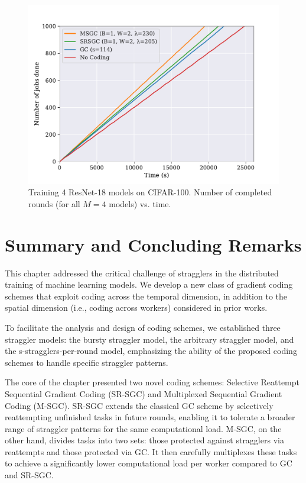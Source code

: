 \begin{figure}[!h]
    \centering
    \includegraphics[width=.8\textwidth]{figs/ch2/resnet_numrounds.pdf}
    \caption{ Training 4 ResNet-18 models on CIFAR-100. Number of completed rounds (for all $M=4$ models) vs. time.}
    \label{ch2:fig:resnet}
\end{figure}

\FloatBarrier

\section{Summary and Concluding Remarks}
 
This chapter addressed the critical challenge of stragglers in the distributed training of machine learning models. We develop a new class of gradient coding schemes that exploit coding across the temporal dimension, in addition to the spatial dimension (i.e., coding across workers) considered in prior works.

To facilitate the analysis and design of coding schemes, we established three straggler models: the bursty straggler model, the arbitrary straggler model, and the s-stragglers-per-round model, emphasizing the ability of the proposed coding schemes to handle specific straggler patterns.

The core of the chapter presented two novel coding schemes: Selective Reattempt Sequential Gradient Coding (SR-SGC) and Multiplexed Sequential Gradient Coding (M-SGC). SR-SGC extends the classical GC scheme by selectively reattempting unfinished tasks in future rounds, enabling it to tolerate a broader range of straggler patterns for the same computational load. M-SGC, on the other hand, divides tasks into two sets: those protected against stragglers via reattempts and those protected via GC. It then carefully multiplexes these tasks to achieve a significantly lower computational load per worker compared to GC and SR-SGC.

